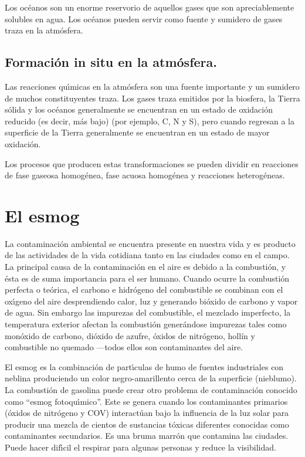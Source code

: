 Los océanos son un enorme reservorio de aquellos gases que son apreciablemente solubles en agua. Los océanos pueden servir como fuente y sumidero de gases traza en la atmósfera.

\subsection{Formación in situ en la atmósfera.}

Las reacciones qu\'{\i}micas en la atmósfera son una fuente importante y un sumidero de muchos constituyentes traza. Los gases traza emitidos por la biosfera, la Tierra sólida y los océanos generalmente se encuentran en un estado de oxidación reducido (es decir, más bajo) (por ejemplo, C, N y S), pero cuando regresan a la superficie de la Tierra generalmente se encuentran en un estado de  mayor oxidación.

Los procesos que producen estas transformaciones se pueden dividir en reacciones de fase gaseosa homogénea, fase acuosa homogénea y reacciones heterogéneas.

 \section{El esmog}

 La contaminaci\'on ambiental se encuentra presente en nuestra vida y es producto de las actividades de la vida cotidiana tanto en las ciudades como en el campo. La principal causa de la contaminaci\'on en el aire es debido a la combusti\'on, y \'esta es de suma importancia para el ser humano. Cuando ocurre la combusti\'on perfecta o te\'orica, el carbono e hidr\'ogeno del combustible se combinan con el ox\'{\i}geno del aire desprendiendo calor, luz y generando bi\'oxido de carbono y vapor de agua. Sin embargo las impurezas del combustible, el mezclado imperfecto, la temperatura exterior afectan la combusti\'on generándose impurezas tales como mon\'oxido de carbono, di\'oxido de azufre, \'oxidos de nitr\'ogeno, holl\'in y combustible no quemado ---todos ellos son contaminantes del aire.
 
 El esmog es la combinaci\'on de part\'{\i}culas de humo de fuentes industriales con neblina produciendo un color negro-amarillento cerca de la superficie (nieblumo). La combusti\'on de gasolina puede crear otro problema de contaminaci\'on conocido como ``esmog fotoqu\'{\i}mico''. Este se genera cuando los contaminantes primarios (\'oxidos de nitr\'ogeno y COV) interact\'uan bajo la influencia de la luz solar para producir una mezcla de cientos de sustancias t\'oxicas diferentes conocidas como contaminantes secundarios. Es una bruma marr\'on que contamina las ciudades. Puede hacer dif\'{\i}cil el respirar para algunas personas y reduce la visibilidad.

